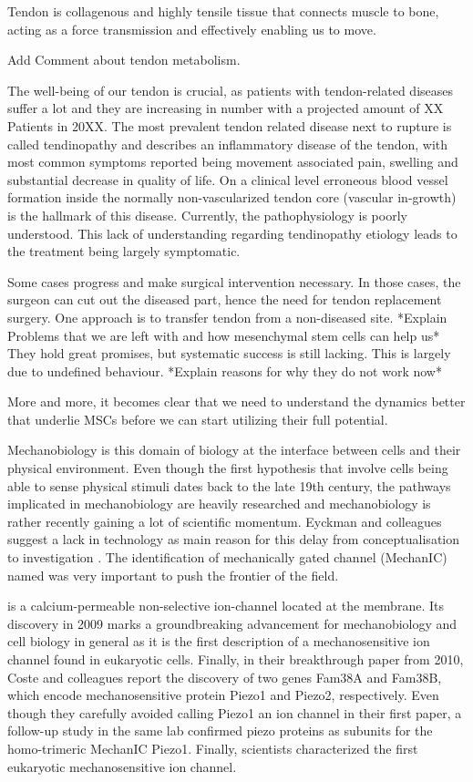 Tendon is collagenous and highly tensile tissue that connects muscle to bone, acting as a force transmission and effectively enabling us to move. 

Add Comment about tendon metabolism. 

The well-being of our tendon is crucial, as patients with tendon-related diseases suffer a lot and they are increasing in number with a projected amount of XX Patients in 20XX. The most prevalent tendon related disease next to rupture is called tendinopathy and describes an inflammatory disease of the tendon, with most common symptoms reported being movement associated pain, swelling and substantial decrease in quality of life. On a clinical level erroneous blood vessel formation inside the normally non-vascularized tendon core (vascular in-growth) is the hallmark of this disease. Currently, the pathophysiology is poorly understood. This lack of understanding regarding tendinopathy etiology leads to the treatment being largely symptomatic. 

Some cases progress and make surgical intervention necessary. In those cases, the surgeon can cut out the diseased part, hence the need for tendon replacement surgery.  One approach is to transfer tendon from a non-diseased site. *Explain Problems that we are left with and how mesenchymal stem cells can help us* They hold great promises, but systematic success is still lacking. This is largely due to undefined behaviour. *Explain reasons for why they do not work now* 

More and more, it becomes clear that we need to understand the dynamics better that underlie MSCs before we can start utilizing their full potential.\par 

Mechanobiology is this domain of biology at the interface between cells and their physical environment. 
Even though the first hypothesis that involve cells being able to sense physical stimuli dates back to the late 19th century, the pathways implicated in mechanobiology are heavily researched and mechanobiology is rather recently gaining a lot of scientific momentum. Eyckman and colleagues suggest a lack in technology as main reason for this delay from conceptualisation to investigation \cite{Eyckmans2011}. 
The identification of mechanically gated channel (MechanIC) named \Piezo{} was very important to push the frontier of the field. \par
\Piezo{} is a calcium-permeable non-selective ion-channel located at the membrane. Its discovery in 2009 marks a groundbreaking advancement for mechanobiology and cell biology in general as it is the first description of a mechanosensitive ion channel found in eukaryotic cells.\cite{Coste2010} 
Finally, in their breakthrough paper from 2010, Coste and colleagues report the discovery of two genes Fam38A and Fam38B, which encode mechanosensitive protein Piezo1 and Piezo2, respectively. Even though they carefully avoided calling Piezo1 an ion channel in their first paper, a follow-up study in the same lab confirmed piezo proteins as subunits for the homo-trimeric MechanIC Piezo1. Finally, scientists characterized the first eukaryotic mechanosensitive ion channel. 




